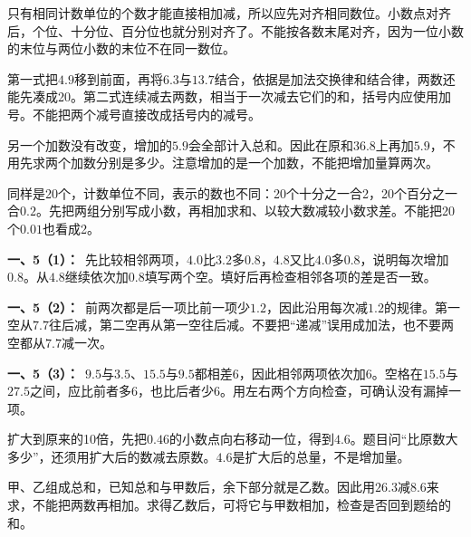 \documentclass[multi=snippet,border=0pt]{standalone}
\newenvironment{snippet}[3]{\begin{minipage}{#1bp}\color{answerred}\fontsize{#2}{#3}\selectfont\raggedright}{\end{minipage}}
\begin{document}
\begin{snippet}{505}{11.5}{14}只有相同计数单位的个数才能直接相加减，所以应先对齐相同数位。小数点对齐后，个位、十分位、百分位也就分别对齐了。不能按各数末尾对齐，因为一位小数的末位与两位小数的末位不在同一数位。\end{snippet}
\begin{snippet}{505}{11.5}{14}第一式把\(4.9\)移到前面，再将\(6.3\)与\(13.7\)结合，依据是加法交换律和结合律，两数还能先凑成20。第二式连续减去两数，相当于一次减去它们的和，括号内应使用加号。不能把两个减号直接改成括号内的减号。\end{snippet}
\begin{snippet}{505}{11.5}{14}另一个加数没有改变，增加的\(5.9\)会全部计入总和。因此在原和\(36.8\)上再加\(5.9\)，不用先求两个加数分别是多少。注意增加的是一个加数，不能把增加量算两次。\end{snippet}
\begin{snippet}{505}{11.5}{14}同样是20个，计数单位不同，表示的数也不同：20个十分之一合2，20个百分之一合\(0.2\)。先把两组分别写成小数，再相加求和、以较大数减较小数求差。不能把20个\(0.01\)也看成2。\end{snippet}
\begin{snippet}{505}{11.5}{14}\textbf{一、5（1）：}\ 先比较相邻两项，\(4.0\)比\(3.2\)多\(0.8\)，\(4.8\)又比\(4.0\)多\(0.8\)，说明每次增加\(0.8\)。从\(4.8\)继续依次加\(0.8\)填写两个空。填好后再检查相邻各项的差是否一致。\end{snippet}
\begin{snippet}{505}{11.5}{14}\textbf{一、5（2）：}\ 前两次都是后一项比前一项少\(1.2\)，因此沿用每次减\(1.2\)的规律。第一空从\(7.7\)往后减，第二空再从第一空往后减。不要把“递减”误用成加法，也不要两空都从\(7.7\)减一次。\end{snippet}
\begin{snippet}{505}{11.5}{14}\textbf{一、5（3）：}\ \(9.5\)与\(3.5\)、\(15.5\)与\(9.5\)都相差6，因此相邻两项依次加6。空格在\(15.5\)与\(27.5\)之间，应比前者多6，也比后者少6。用左右两个方向检查，可确认没有漏掉一项。\end{snippet}
\begin{snippet}{505}{11.5}{14}扩大到原来的10倍，先把\(0.46\)的小数点向右移动一位，得到\(4.6\)。题目问“比原数大多少”，还须用扩大后的数减去原数。\(4.6\)是扩大后的总量，不是增加量。\end{snippet}
\begin{snippet}{505}{11.5}{14}甲、乙组成总和，已知总和与甲数后，余下部分就是乙数。因此用\(26.3\)减\(8.6\)来求，不能把两数再相加。求得乙数后，可将它与甲数相加，检查是否回到题给的和。\end{snippet}
\end{document}
